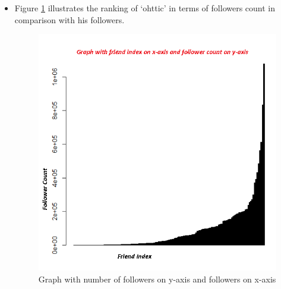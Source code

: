 \begin{itemize}
\newpage
\item Figure \ref{fig:q2fig2} illustrates the ranking of `ohttic' in terms of followers count in comparison with his followers.
\begin{figure}[h!]
\begin{center}
\includegraphics[scale=0.55, keepaspectratio=true]{figures/followerWithoutLog.PNG}
\caption{Graph with number of followers on y-axis and followers on x-axis }
\label{fig:q2fig2}
\end{center}
\end{figure}


\end{itemize}
